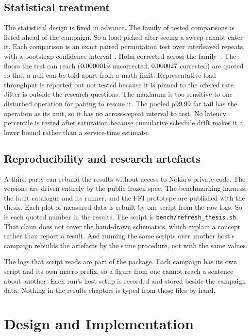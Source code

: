 \documentclass[english,oneside,a4paper,censored,csm,software-track-2020]{HYthesisML}
\begin{document}
\section{Statistical treatment}\label{sec:statsbrief}
The statistical design is fixed in advance. The family of tested comparisons is
listed ahead of the campaign. So a load picked after seeing a sweep cannot
enter it. Each comparison is an exact paired permutation test over \NRepeats{}
interleaved repeats, with a bootstrap confidence
interval~\cite{efron1993bootstrap}, Holm-corrected across the
family~\cite{holm1979simple}. The floors the test can reach ($0.0000019$
uncorrected, $0.000027$ corrected) are quoted so that a null can be
told apart from a math limit. Representative-load throughput is reported but
not tested because it is pinned to the offered rate. Jitter is outside the
research questions. The maximum is too sensitive to one disturbed operation
for pairing to rescue it. The pooled p99.99 far tail has the operation as its
unit, so it has no across-repeat interval to test. No latency percentile is
tested after saturation because cumulative schedule drift makes it a lower
bound rather than a service-time estimate.

\section{Reproducibility and research artefacts}\label{sec:repro}
A third party can rebuild the results without access to Nokia's private code.
The versions are driven entirely by the public frozen spec. The benchmarking
harness, the fault catalogue and its runner, and the FFI prototype are
published with the thesis. Each plot of measured data is rebuilt by one
script from the raw logs. So is each quoted number in the results. The script
is \texttt{bench/refresh\_thesis.sh}. That claim does not cover the hand-drawn
schematics, which explain a concept rather than report a result. And running
the same scripts over another host's campaign rebuilds the artefacts by the
same procedure, not with the same values.

The logs that script reads are part of the package. Each campaign has its own
script and its own macro prefix, so a figure from one cannot reach a sentence
about another. Each run's host setup is recorded and stored beside the
campaign data. Nothing in the results chapters is typed from those files by
hand.

\chapter{Design and Implementation\label{chapter:design}}
\end{document}
